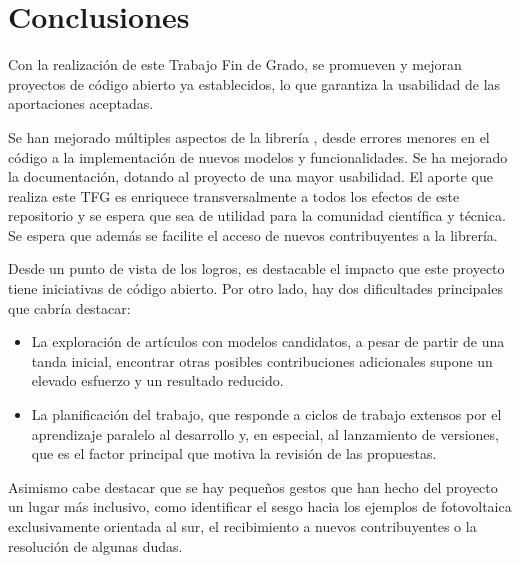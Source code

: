 
\section{Conclusiones} \label{sct:resultados:conclusiones}

Con la realización de este Trabajo Fin de Grado, se promueven y mejoran proyectos de código abierto ya establecidos, lo que garantiza la usabilidad de las aportaciones aceptadas.

Se han mejorado múltiples aspectos de la librería \pvlibpy{}, desde errores menores en el código a la implementación de nuevos modelos y funcionalidades. Se ha mejorado la documentación, dotando al proyecto de una mayor usabilidad. El aporte que realiza este TFG es enriquece transversalmente a todos los efectos de este \gls{repositorio} y se espera que sea de utilidad para la comunidad científica y técnica. Se espera que además se facilite el acceso de nuevos contribuyentes a la librería.

Desde un punto de vista de los logros, es destacable el impacto que este proyecto tiene iniciativas de código abierto. Por otro lado, hay dos dificultades principales que cabría destacar:

\begin{itemize}
    \item La exploración de artículos con modelos candidatos, a pesar de partir de una tanda inicial, encontrar otras posibles contribuciones adicionales supone un elevado esfuerzo y un resultado reducido.
    \item La planificación del trabajo, que responde a ciclos de trabajo extensos por el aprendizaje paralelo al desarrollo y, en especial, al lanzamiento de versiones, que es el factor principal que motiva la revisión de las propuestas.
\end{itemize}

Asimismo cabe destacar que se hay pequeños gestos que han hecho del proyecto un lugar más inclusivo, como identificar el sesgo hacia los ejemplos de fotovoltaica exclusivamente orientada al sur, el recibimiento a nuevos contribuyentes o la resolución de algunas dudas.


